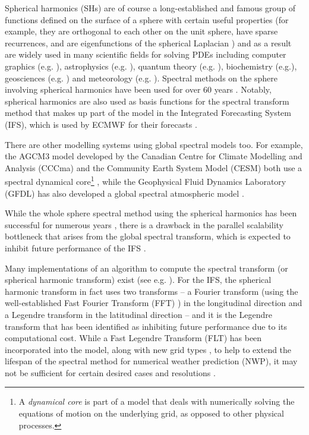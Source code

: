 Spherical harmonics (SHs) are of course a long-established and famous group of functions defined on the surface of a sphere with certain useful properties (for example, they are orthogonal to each other on the unit sphere, have sparse recurrences, and are eigenfunctions of the spherical Laplacian ) and as a result are widely used in many scientific fields for solving PDEs including computer graphics (e.g. \cite{moon2008efficient, sloan2013efficient}), astrophysics (e.g. \cite{vasil2019tensor}), quantum theory (e.g. \cite{varshalovich1988quantum}), biochemistry (e.g.\cite{parimal2014application, basko1998application}), geosciences (e.g. \cite{fletcher2017data, hollerbach2013parity}) and meteorology (e.g. \cite{evans1998spherical, rubinstein2015scalar, wedi2013fast, ecmwf2020scalability, courtier1998ecmwf, silberman1954planetary, gottlieb1977numerical}). Spectral methods on the sphere involving spherical harmonics have been used for over 60 years \cite{silberman1954planetary}. Notably, spherical harmonics are also used as basis functions for the spectral transform method that makes up part of the model in the Integrated Forecasting System (IFS), which is used by ECMWF for their forecasts \cite{wedi2013fast}. 

There are other modelling systems using global spectral models too. For example, the AGCM3 model developed by the Canadian Centre for Climate Modelling and Analysis (CCCma) and the Community Earth System Model (CESM) both use a spectral dynamical core\footnote{A \textit{dynamical core} is part of a model that deals with numerically solving the equations of motion on the underlying grid, as opposed to other physical processes.} \cite{hurrell2013community, scinocca2008cccma}, while the Geophysical Fluid Dynamics Laboratory (GFDL) has also developed a global spectral atmospheric model \cite{gordon1982description}.

While the whole sphere spectral method using the spherical harmonics has been successful for numerous years \cite{williamson2007evolution}, there is a drawback in the parallel scalability bottleneck that arises from the global spectral transform, which is expected to inhibit future performance of the IFS \cite{ecmwf2020scalability, wedi2013fast}. 

Many implementations of an algorithm to compute the spectral transform (or spherical harmonic transform) exist (see e.g. \cite{slevinsky2019fast, suda2002fast}). For the IFS, the spherical harmonic transform in fact uses two transforms -- a Fourier transform (using the well-established Fast Fourier Transform (FFT) \cite{cooley1965algorithm}) in the longitudinal direction and a Legendre transform in the latitudinal direction -- and it is the Legendre transform that has been identified as inhibiting future performance due to its computational cost. While a Fast Legendre Transform (FLT) \cite{wedi2013fast} has been incorporated into the model, along with new grid types \cite{malardel2016new}, to help to extend the lifespan of the spectral method for numerical weather prediction (NWP), it may not be sufficient for certain desired cases and resolutions \cite{wedi2014increasing}. 


